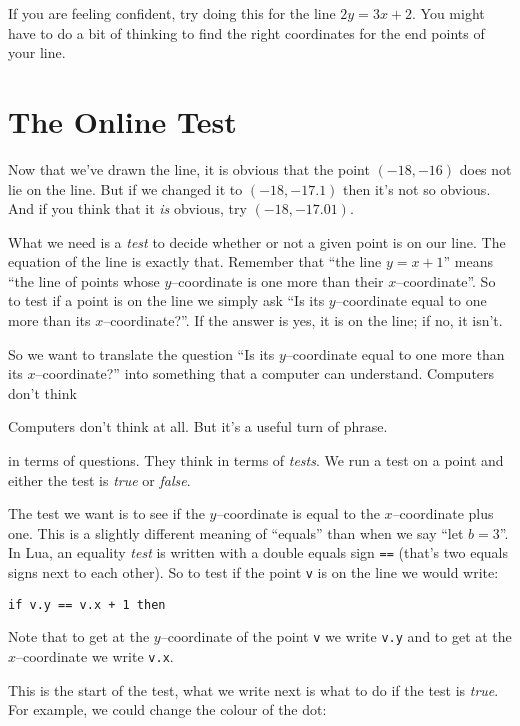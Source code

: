 \documentclass[
  xhtml,%
  use filename%
]{internet}
\begin{document}
If you are feeling confident, try doing this for the line \(2 y = 3 x + 2\).
You might have to do a bit of thinking to find the right coordinates for the end points of your line.

\section{The Online Test}

Now that we've drawn the line, it is obvious that the point \((-18,-16)\) does not lie on the line.
But if we changed it to \((-18,-17.1)\) then it's not so obvious.
And if you think that it \emph{is} obvious, try \((-18,-17.01)\).

What we need is a \emph{test} to decide whether or not a given point is on our line.
The equation of the line is exactly that.
Remember that ``the line \(y = x + 1\)'' means ``the line of points whose \(y\)--coordinate is one more than their \(x\)--coordinate''.
So to test if a point is on the line we simply ask ``Is its \(y\)--coordinate equal to one more than its \(x\)--coordinate?''.
If the answer is yes, it is on the line; if no, it isn't.

So we want to translate the question ``Is its \(y\)--coordinate equal to one more than its \(x\)--coordinate?'' into something that a computer can understand.
Computers don't think\begin{marginpar}Computers don't think at all.  But it's a useful turn of phrase.\end{marginpar} in terms of questions.
They think in terms of \emph{tests}.
We run a test on a point and either the test is \emph{true} or \emph{false}.

The test we want is to see if the \(y\)--coordinate is equal to the \(x\)--coordinate plus one.
This is a slightly different meaning of ``equals'' than when we say ``let \(b = 3\)''.
In Lua, an equality \emph{test} is written with a double equals sign \verb+==+ (that's two equals signs next to each other).
So to test if the point \verb+v+ is on the line we would write:

\begin{verbatim}
if v.y == v.x + 1 then
\end{verbatim}

Note that to get at the \(y\)--coordinate of the point \verb+v+ we write \verb+v.y+ and to get at the \(x\)--coordinate we write \verb+v.x+. 

This is the start of the test, what we write next is what to do if the test is \emph{true}.
For example, we could change the colour of the dot:
\end{document}
